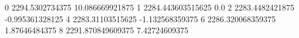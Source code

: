 0 2294.5302734375 10.086669921875
1 2284.443603515625 0.0
2 2283.4482421875 -0.995361328125
4 2283.31103515625 -1.132568359375
6 2286.320068359375 1.87646484375
8 2291.870849609375 7.42724609375

